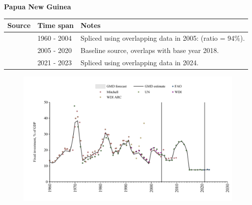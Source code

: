 \documentclass[12pt,a4paper,landscape]{article}
\begin{document}
\begin{adjustbox}{max totalsize={\paperwidth}{\paperheight},center}
\begin{minipage}[t][\textheight][t]{\textwidth}
\vspace*{0.5cm}
{}
\begin{center}
{\Large\bfseries Papua New Guinea}
\end{center}
\vspace{0.5cm}
\begin{table}[H]
\centering
\small
\begin{tabular}{|l|l|l|}
\hline
\textbf{Source} & \textbf{Time span} & \textbf{Notes} \\
\hline
\rowcolor{white}\cite{WDI}& 1960 - 2004 &Spliced using overlapping data in 2005: (ratio = 94\%).\\
\rowcolor{lightgray}\cite{UN}& 2005 - 2020 &Baseline source, overlaps with base year 2018.\\
\rowcolor{white}\cite{FAO}& 2021 - 2023 &Spliced using overlapping data in 2024.\\
\hline
\end{tabular}
\end{table}
\begin{figure}[H]
\centering
\includegraphics[width=\textwidth,height=0.6\textheight,keepaspectratio]{graphs/PNG_finv_GDP.pdf}
\end{figure}
\end{minipage}
\end{adjustbox}
\end{document}
